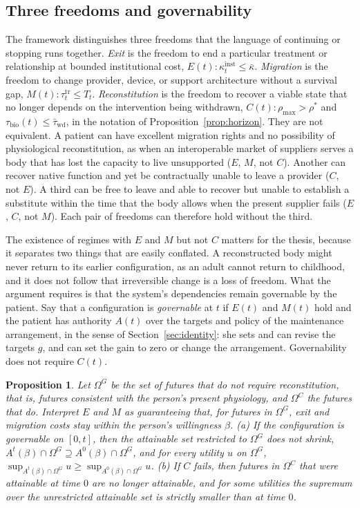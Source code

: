 \documentclass[11pt]{article}
\theoremstyle{plain}
\newtheorem{proposition}{Proposition}
\theoremstyle{definition}
\theoremstyle{remark}
\begin{document}
\subsection{Three freedoms and governability}

The framework distinguishes three freedoms that the language of continuing or stopping runs together. \emph{Exit} is the freedom to end a particular treatment or relationship at bounded institutional cost, $E(t):\kappa^{\mathrm{inst}}_t\le\bar\kappa$. \emph{Migration} is the freedom to change provider, device, or support architecture without a survival gap, $M(t):\tau^{\mathrm{tr}}_t\le T_t$. \emph{Reconstitution} is the freedom to recover a viable state that no longer depends on the intervention being withdrawn, $C(t):\rho_{\max}>\rho^\ast$ and $\tau_{\mathrm{bio}}(t)\le\bar\tau_{\mathrm{wd}}$, in the notation of Proposition~\ref{prop:horizon}. They are not equivalent. A patient can have excellent migration rights and no possibility of physiological reconstitution, as when an interoperable market of suppliers serves a body that has lost the capacity to live unsupported ($E$, $M$, not $C$). Another can recover native function and yet be contractually unable to leave a provider ($C$, not $E$). A third can be free to leave and able to recover but unable to establish a substitute within the time that the body allows when the present supplier fails ($E$, $C$, not $M$). Each pair of freedoms can therefore hold without the third.

The existence of regimes with $E$ and $M$ but not $C$ matters for the thesis, because it separates two things that are easily conflated. A reconstructed body might never return to its earlier configuration, as an adult cannot return to childhood, and it does not follow that irreversible change is a loss of freedom. What the argument requires is that the system's dependencies remain governable by the patient. Say that a configuration is \emph{governable} at $t$ if $E(t)$ and $M(t)$ hold and the patient has authority $A(t)$ over the targets and policy of the maintenance arrangement, in the sense of Section~\ref{sec:identity}: she sets and can revise the targets $g$, and can set the gain to zero or change the arrangement. Governability does not require $C(t)$.

\begin{proposition}\label{prop:govern}
Let $\Omega^G$ be the set of futures that do not require reconstitution, that is, futures consistent with the person's present physiology, and $\Omega^C$ the futures that do. Interpret $E$ and $M$ as guaranteeing that, for futures in $\Omega^G$, exit and migration costs stay within the person's willingness $\beta$. (a) If the configuration is governable on $[0,t]$, then the attainable set restricted to $\Omega^G$ does not shrink, $A^t(\beta)\cap\Omega^G\supseteq A^0(\beta)\cap\Omega^G$, and for every utility $u$ on $\Omega^G$, $\sup_{A^t(\beta)\cap\Omega^G}u\ge\sup_{A^0(\beta)\cap\Omega^G}u$. (b) If $C$ fails, then futures in $\Omega^C$ that were attainable at time $0$ are no longer attainable, and for some utilities the supremum over the unrestricted attainable set is strictly smaller than at time $0$.
\end{proposition}
\end{document}
